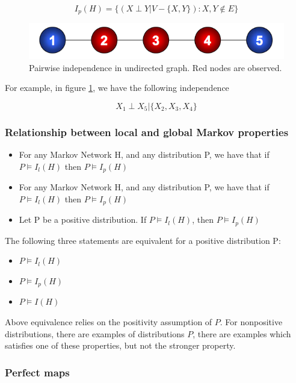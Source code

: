 \documentclass[twoside]{article}
\begin{document}
\[I_p(H)=\{(X\perp Y|V-\{X,Y\}):{X,Y}\notin E\}\]

\begin{figure}
  \centering
  \includegraphics[width=.5\linewidth]{assets/ugn_pair_independence.png}
  \caption{Pairwise independence in undirected graph. Red nodes are observed.}
  \label{fig:pairwise_independence}
\end{figure}

For example, in figure \ref{fig:pairwise_independence}, we have the following independence

\[X_1\perp X_5 | \{X_2, X_3,X_4\}\]

\subsubsection{Relationship between local and global Markov properties}

\begin{itemize}
\item For any Markov Network H, and any distribution P, we have that if \(P \models I_l(H)\) then \(P \models I_p(H)\)
\item For any Markov Network H, and any distribution P, we have that if \(P \models I_l(H)\) then \(P \models I_p(H)\)
\item Let P be a positive distribution. If \(P \models I_l(H)\), then \(P \models I_p(H)\)
\end{itemize}

The following three statements are equivalent for a positive distribution P:
\begin{itemize}
\item \(P \models I_l(H)\)
\item \(P \models I_p(H)\)
\item \(P \models I(H)\)
\end{itemize}

Above equivalence relies on the positivity assumption of \(P\). For nonpositive distributions, there are examples of distributions \(P\), there are examples which satisfies one of these properties, but not the stronger property.

\subsubsection{Perfect maps}
\end{document}
